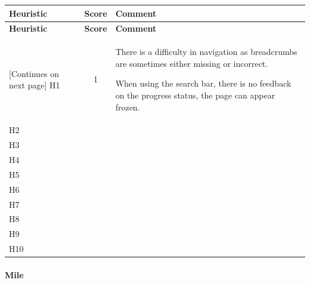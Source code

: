 \begin{tabularx}{\linewidth}{l c X}
\toprule
\textbf{Heuristic} & \textbf{Score} & \textbf{Comment} \\
\midrule
\endfirsthead
\toprule
\textbf{Heuristic} & \textbf{Score} & \textbf{Comment} \\
\midrule
\endhead
\midrule
\footnotesize [Continues on next page]
\endfoot
\bottomrule
\endlastfoot
    H1 & 1 & There is a difficulty in navigation as breadcrumbs are sometimes either missing or incorrect.\par When using the search bar, there is no feedback on the progress status, the page can appear frozen. \\ \midrule
    H2 &  & \\ \midrule
    H3 &  & \\ \midrule
    H4 &  & \\ \midrule
    H5 &  & \\ \midrule
    H6 &  & \\ \midrule
    H7 &  & \\ \midrule
    H8 &  & \\ \midrule
    H9 &  & \\ \midrule
    H10 &  &
\end{tabularx}

\paragraph{Mile}


